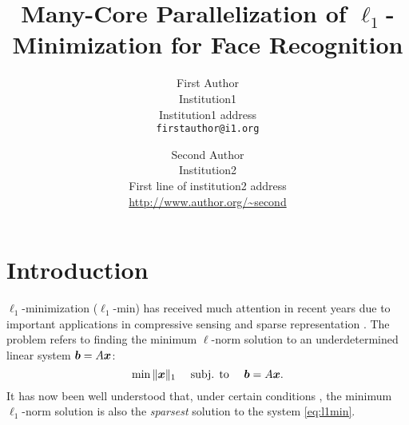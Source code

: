 \documentclass[10pt,twocolumn,letterpaper]{article}
\begin{document}
\title{Many-Core Parallelization of $\ell_1$-Minimization for Face Recognition
}

\author{First Author\\
Institution1\\
Institution1 address\\
{\tt\small firstauthor@i1.org}
\and
Second Author\\
Institution2\\
First line of institution2 address\\
{\small\url{http://www.author.org/~second}}
}

\maketitle

\begin{abstract}

\end{abstract}

\section{Introduction} 

$\ell_1$-minimization ($\ell_1$-min) has received much attention in recent years due to important applications
in compressive sensing \cite{BrucksteinA2007} and sparse representation \cite{WrightJ2010-PIEEE}.
The problem refers to finding the minimum $\ell$-norm solution to an underdetermined linear system ${\boldsymbol{b}}=A{\boldsymbol{x}}$:
\begin{equation}
\min \|{\boldsymbol{x}}\|_1\quad \mbox{ subj. to }\quad {\boldsymbol{b}} = A{\boldsymbol{x}}.
\label{eq:l1min}
\end{equation}
It has now been well understood that, under certain conditions \cite{CandesE2005-IT_1,DonohoD2004}, the minimum $\ell_1$-norm solution is
also the \emph{sparsest} solution to the system \eqref{eq:l1min}.
\end{document}
